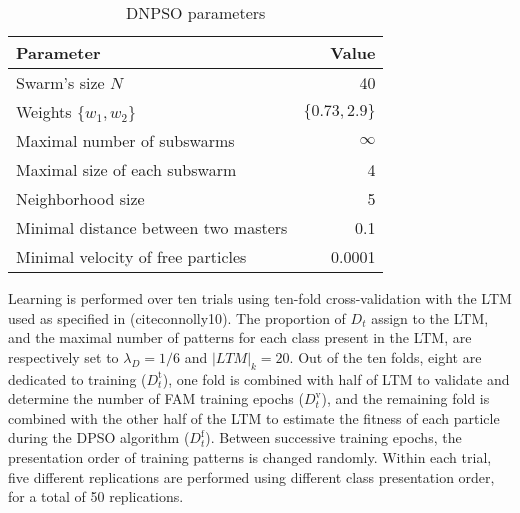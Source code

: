 \begin{table*}[t]
  \centering
  \caption{DNPSO parameters}
  \begin{tabular*}{\linewidth}{@{\extracolsep{\fill}}|lr|}
  	\hline
	  \textbf{Parameter} & \textbf{Value}     										\\ \hline
		Swarm's size $N$												&  40    						\\
		Weights $\{w_1,w_2\}$ 									&  $\{0.73,2.9\}$ 	\\
		Maximal number of subswarms   					&  $\infty$					\\
		Maximal size of each subswarm 					&  4								\\
		Neighborhood size												&  5    						\\
		Minimal distance between two masters    &  0.1   						\\
		Minimal velocity of free particles    &  0.0001    				\\ \hline
	\end{tabular*}
	\label{tab:c2_pso}
\end{table*}

Learning is performed over ten trials using ten-fold cross-validation with the LTM used as specified in (cite{connolly10}).
The proportion of $D_t$ assign to the LTM, and the maximal number of patterns for each class present in the LTM, are respectively set to $\lambda_D=1/6$ and $|LTM|_k=20$.
Out of the ten folds, eight are dedicated to training ($D_t^\text{t}$), one fold is combined with half of LTM to validate and determine the number of FAM training epochs ($D_t^\text{v}$), and the remaining fold is combined with the other half of the LTM to estimate the fitness of each particle during the DPSO algorithm ($D_t^\text{f}$).
Between successive training epochs, the presentation order of training patterns is changed randomly.
Within each trial, five different replications are performed using different class presentation order, for a total of 50 replications.

